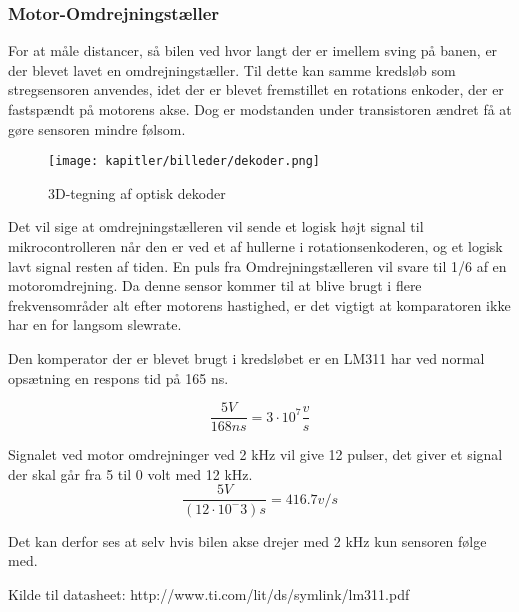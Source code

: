 \subsubsection{Motor-Omdrejningstæller}
\label{motor-omdrej}

For at måle distancer, så bilen ved hvor langt der er imellem sving på banen, er der blevet lavet en omdrejningstæller. Til dette kan samme kredsløb som stregsensoren anvendes, idet der er blevet fremstillet en rotations enkoder, der er fastspændt på motorens akse. Dog er modstanden under transistoren ændret få at gøre sensoren mindre følsom.


\begin{figure}[ht]
    \centering
    \texttt{[image: kapitler/billeder/dekoder.png]}
    \caption{3D-tegning af optisk dekoder}
    \label{fig:dekoder}
\end{figure}


Det vil sige at omdrejningstælleren vil sende et logisk højt signal til mikrocontrolleren når den er ved et af hullerne i  rotationsenkoderen, og et logisk lavt signal resten af tiden. En puls fra Omdrejningstælleren vil svare til 1/6 af en motoromdrejning.
Da denne sensor kommer til at blive brugt i flere frekvensområder alt efter motorens hastighed, er det vigtigt at komparatoren ikke har en for langsom slewrate.

Den komperator der er blevet brugt i kredsløbet er en LM311 har ved normal opsætning en respons tid på 165 ns.

\begin{equation}
\frac{5 V}{168 ns} = 3 \cdot 10^7 \frac{v}{s}
\end{equation}

Signalet ved motor omdrejninger ved 2 kHz vil give 12 pulser, det giver et signal der skal går fra 5 til 0 volt med 12 kHz.
\begin{equation}
\frac{5 V}{(12 \cdot 10^-3)s} = 416.7 v/s
\end{equation}

Det kan derfor ses at selv hvis bilen akse drejer med 2 kHz kun sensoren følge med.


Kilde til datasheet: http://www.ti.com/lit/ds/symlink/lm311.pdf
